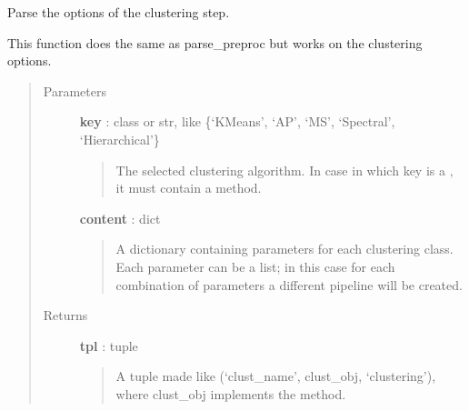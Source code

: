 \documentclass[letterpaper,10pt,english]{sphinxmanual}
\begin{document}
\begin{fulllineitems}
\label{index:adenine.core.define_pipeline.parse_clustering}
Parse the options of the clustering step.

This function does the same as parse\_preproc but works on the clustering
options.
\begin{quote}\begin{description}
\item[{Parameters}] \leavevmode
\textbf{key} : class or str, like \{`KMeans', `AP', `MS', `Spectral', `Hierarchical'\}
\begin{quote}

The selected clustering algorithm. In case in which key
is a , it must contain a  method.
\end{quote}

\textbf{content} : dict
\begin{quote}

A dictionary containing parameters for each clustering class.
Each parameter can be a list; in this case for each combination
of parameters a different pipeline will be created.
\end{quote}

\item[{Returns}] \leavevmode
\textbf{tpl} : tuple
\begin{quote}

A tuple made like (`clust\_name', clust\_obj, `clustering'), where
clust\_obj implements the  method.
\end{quote}

\end{description}\end{quote}

\end{fulllineitems}

\end{document}
